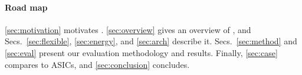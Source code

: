\paragraph{Road map}
%
\autoref{sec:motivation} motivates \snafu.
%
\autoref{sec:overview} gives an overview of \snafu,
and Secs.~\ref{sec:flexible}, \ref{sec:energy}, and \ref{sec:arch} describe it.
%
Secs.~\ref{sec:method} and \ref{sec:eval} present our evaluation methodology and results.
%
Finally, \autoref{sec:case} compares \snafu to ASICs, and
\autoref{sec:conclusion} concludes.

